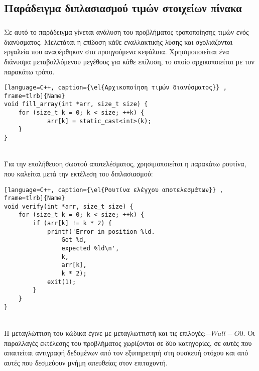 \subsection{Παράδειγμα διπλασιασμού τιμών στοιχείων πίνακα}
\subparagraph{}
Σε αυτό το παράδειγμα γίνεται ανάλυση του προβλήματος τροποποίησης τιμών ενός διανύσματος. Μελετάται η επίδοση κάθε εναλλακτικής λύσης και σχολιάζονται εργαλεία που αναφέρθηκαν στα προηγούμενα κεφάλαια. Χρησιμοποιείται ένα διάνυσμα μεταβαλλόμενου μεγέθους για κάθε επίλυση, το οποίο αρχικοποιείται με τον παρακάτω τρόπο.
\begin{lstlisting}[language=C++, caption={\el{Αρχικοποίηση τιμών διανύσματος}} , frame=tlrb]{Name}
void fill_array(int *arr, size_t size) {
    for (size_t k = 0; k < size; ++k) {
            arr[k] = static_cast<int>(k);
    }
}
\end{lstlisting}
\ \\
Για την επαλήθευση σωστού αποτελέσματος, χρησιμοποιείται η παρακάτω ρουτίνα, που καλείται μετά την εκτέλεση του διπλασιασμού:
\ \\
\begin{lstlisting}[language=C++, caption={\el{Ρουτίνα ελέγχου αποτελεσμάτων}} , frame=tlrb]{Name}
void verify(int *arr, size_t size) {
	for (size_t k = 0; k < size; ++k) {
		if (arr[k] != k * 2) {
        	printf('Error in position %ld.
        		Got %d, 
        		expected %ld\n', 
        		k, 
        		arr[k], 
        		k * 2);
			exit(1);
		}
	}
}
\end{lstlisting}
\ \\
Η μεταγλώττιση του κώδικα έγινε με μεταγλωττιστή \emph{} και τις επιλογές:$-Wall -O0$. Οι παραλλαγές εκτέλεσης του προβλήματος χωρίζονται σε δύο κατηγορίες, σε αυτές που απαιτείται αντιγραφή δεδομένων από τον εξυπηρετητή στη συσκευή στόχου και από αυτές που δεσμεύουν μνήμη απευθείας στον επιταχυντή.

\clearpage
